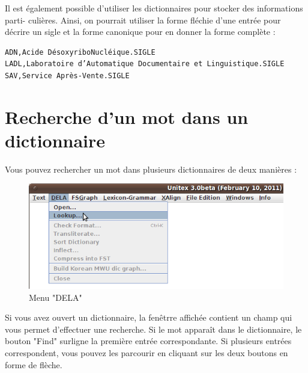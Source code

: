 Il est également possible d’utiliser les dictionnaires pour stocker des informations parti-
culières. Ainsi, on pourrait utiliser la forme fléchie d’une entrée pour décrire un sigle et la
forme canonique pour en donner la forme complète :

\bigskip
\begin{verbatim}
ADN,Acide DésoxyriboNucléique.SIGLE
LADL,Laboratoire d’Automatique Documentaire et Linguistique.SIGLE
SAV,Service Après-Vente.SIGLE
\end{verbatim}



\section{Recherche d'un mot dans un dictionnaire}
 
\label{section-dictionary-lookup}
Vous pouvez rechercher un mot dans plusieurs dictionnaires de deux manières : 

\begin{figure}[h!]
\begin{center}
\includegraphics[width=13cm]{resources/img/fig3-1.png}
\caption{Menu "DELA"}
\end{center}
\end{figure}

\bigskip
\noindent
Si vous avez ouvert un dictionnaire, la fenêtrre affichée contient un champ qui vous permet
d'effectuer une recherche. Si le mot apparaît dans le dictionnaire, le bouton "Find" surligne la
première entrée correspondante. Si plusieurs entrées correspondent, vous pouvez les parcourir en
cliquant sur les deux boutons en forme de flèche.

